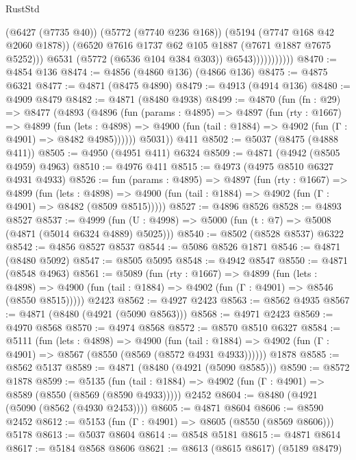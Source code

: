 \begin{lexlean}{RustStd}
\begin{coremodule}
                            (@6427 (@7735 @40))
                            (@5772 (@7740 @236 @168))
                            (@5194 (@7747 @168 @42 @2060 @1878))
                            (@6520 @7616 @1737 @62 @105 @1887 (@7671 @1887 @7675 @5252)))
                          @6531
                          (@5772 (@6536 @104 @384 @303))
                          @6543)))))))))))
@8470 := @4854 @136
@8474 := @4856 (@4860 @136) (@4866 @136)
@8475 := @4875 @6321
@8477 := @4871 (@8475 @4890)
@8479 := @4913 (@4914 @136)
@8480 := @4909 @8479
@8482 := @4871 (@8480 @4938)
@8499 := @4870
    (fun (fn : @29) =>
    @8477
      (@4893
        (@4896
          (fun (params : @4895) =>
          @4897
            (fun (rty : @1667) =>
            @4899
              (fun (lets : @4898) =>
              @4900 (fun (tail : @1884) => @4902 (fun (Γ : @4901) => @8482 @4985))))))
        @5031))
    @411
@8502 := @5037 (@8475 (@4888 @411))
@8505 := @4950 (@4951 @411) @6324
@8509 := @4871 (@4942 (@8505 @4959) @4963)
@8510 := @4976 @411
@8515 := @4973 (@4975 @8510 @6327 @4931 @4933)
@8526 := fun (params : @4895) =>
  @4897
    (fun (rty : @1667) =>
    @4899
      (fun (lets : @4898) =>
      @4900 (fun (tail : @1884) => @4902 (fun (Γ : @4901) => @8482 (@8509 @8515)))))
@8527 := @4896 @8526
@8528 := @4893 @8527
@8537 := @4999 (fun (U : @4998) => @5000 (fun (t : @7) => @5008 (@4871 (@5014 @6324 @4889) @5025)))
@8540 := @8502 (@8528 @8537) @6322
@8542 := @4856 @8527 @8537
@8544 := @5086 @8526 @1871
@8546 := @4871 (@8480 @5092)
@8547 := @8505 @5095
@8548 := @4942 @8547
@8550 := @4871 (@8548 @4963)
@8561 := @5089
    (fun (rty : @1667) =>
    @4899
      (fun (lets : @4898) =>
      @4900 (fun (tail : @1884) => @4902 (fun (Γ : @4901) => @8546 (@8550 @8515)))))
    @2423
@8562 := @4927 @2423
@8563 := @8562 @4935
@8567 := @4871 (@8480 (@4921 (@5090 @8563)))
@8568 := @4971 @2423
@8569 := @4970 @8568
@8570 := @4974 @8568
@8572 := @8570 @8510 @6327
@8584 := @5111
    (fun (lets : @4898) =>
    @4900
      (fun (tail : @1884) => @4902 (fun (Γ : @4901) => @8567 (@8550 (@8569 (@8572 @4931 @4933))))))
    @1878
@8585 := @8562 @5137
@8589 := @4871 (@8480 (@4921 (@5090 @8585)))
@8590 := @8572 @1878
@8599 := @5135
    (fun (tail : @1884) => @4902 (fun (Γ : @4901) => @8589 (@8550 (@8569 (@8590 @4933)))))
    @2452
@8604 := @8480 (@4921 (@5090 (@8562 (@4930 @2453))))
@8605 := @4871 @8604
@8606 := @8590 @2452
@8612 := @5153 (fun (Γ : @4901) => @8605 (@8550 (@8569 @8606))) @5178
@8613 := @5037 @8604
@8614 := @8548 @5181
@8615 := @4871 @8614
@8617 := @5184 @8568 @8606
@8621 := @8613 (@8615 @8617) (@5189 @8479)

\end{coremodule}
\end{lexlean}
